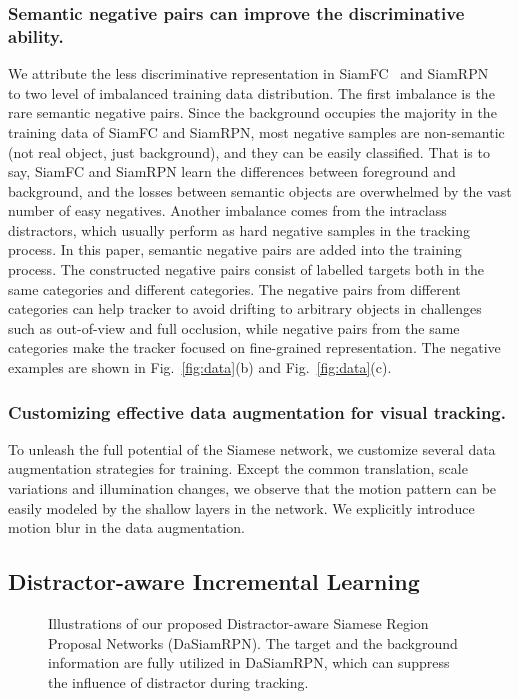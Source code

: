 \documentclass[runningheads]{llncs}
\begin{document}
\subsubsection{Semantic negative pairs can improve the discriminative ability.}
We attribute the less discriminative representation in SiamFC~\cite{SiamFC} and SiamRPN~\cite{SiamRPN} to two level of imbalanced training data distribution. The first imbalance is the rare semantic negative pairs. Since the background occupies the majority in the training data of SiamFC and SiamRPN, most negative samples are non-semantic (not real object, just background), and they can be easily classified.
That is to say, SiamFC and SiamRPN learn the differences between foreground and background, and the losses between semantic objects are overwhelmed by the vast number of easy negatives. Another imbalance comes from the intraclass distractors, which usually perform as hard negative samples in the tracking process. In this paper, semantic negative pairs are added into the training process. The constructed negative pairs consist of labelled targets both in the same categories and different categories. The negative pairs from different categories can help tracker to avoid drifting to arbitrary objects in challenges such as out-of-view and full occlusion, while negative pairs from the same categories make the tracker focused on fine-grained representation. The negative examples are shown in Fig.~\ref{fig:data}(b) and Fig.~\ref{fig:data}(c).


\subsubsection{Customizing effective data augmentation for visual tracking.}
To unleash the full potential of the Siamese network, we customize several data augmentation strategies for training. Except the common translation, scale variations and illumination changes, we observe that the motion pattern can be easily modeled by the shallow layers in the network. We explicitly introduce motion blur in the data augmentation.


\subsection{Distractor-aware Incremental Learning}

\label{sect:DAT}

\begin{figure}[t]

\hfil
{}
\caption{Illustrations of our proposed Distractor-aware Siamese Region Proposal Networks (DaSiamRPN). The target and the background information are fully utilized in DaSiamRPN, which can suppress the influence of distractor during tracking.}
\label{fig:dat}
\end{figure}
\end{document}
